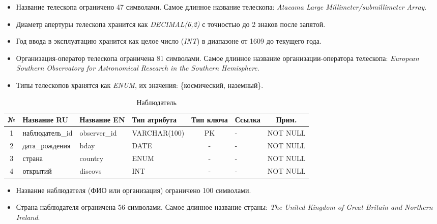 \documentclass[14pt,a4paper]{extarticle}
\begin{document}
	\begin{itemize}
		\item Название телескопа ограничено 47 символами. Самое длинное название телескопа: \textit{Atacama Large Millimeter/submillimeter Array}.
		\item Диаметр апертуры телескопа хранится как \textit{DECIMAL(6,2)} с точностью до
	2 знаков после запятой.
		\item Год ввода в эксплуатацию хранится как целое число (\textit{INT}) в диапазоне от 1609 до
	текущего года.
		\item Организация-оператор телескопа ограничена 81 символами. Самое длинное название организации-оператора
		телескопа: \textit{European Southern Observatory for Astronomical Research in the Southern Hemisphere}.
		\item Типы телескопов хранятся как \textit{ENUM}, их значения: \{космический, наземный\}.
	\end{itemize}

	\begin{table}[H]
    \centering
    \caption{Наблюдатель}
    \small
\begin{tabular}{|c|p{3.2cm}|p{2.6cm}|p{2.8cm}|c|p{1.5cm}|c|}
\hline
№ & Название RU & Название EN & Тип атрибута & Тип ключа & Ссылка & Прим. \\
\hline
1 & наблюдатель\_id & observer\_id & VARCHAR(100) & PK & - & NOT NULL \\
2 & дата\_рождения & bday & DATE & - & - & NOT NULL \\
3 & страна & country & ENUM & - & - & NOT NULL \\
4 & открытий & discovs & INT & - & - & NOT NULL \\
\hline
\end{tabular}
\end{table}

	\begin{itemize}
		\item Название наблюдателя (ФИО или организация) ограничено 100 символами.
		\item Страна наблюдателя ограничена 56 символами. Самое длинное название страны:
		\textit{The United Kingdom of Great Britain and Northern Ireland}.
	\end{itemize}
\end{document}
